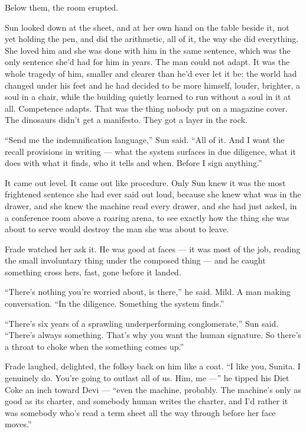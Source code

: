 \documentclass[11pt,openany]{book}
\begin{document}
Below them, the room erupted.

Sun looked down at the sheet, and at her own hand on the table beside it, not yet holding the pen, and did the arithmetic, all of it, the way she did everything. She loved him and she was done with him in the same sentence, which was the only sentence she'd had for him in years. The man could not adapt. It was the whole tragedy of him, smaller and clearer than he'd ever let it be: the world had changed under his feet and he had decided to be more himself, louder, brighter, a soul in a chair, while the building quietly learned to run without a soul in it at all. Competence adapts. That was the thing nobody put on a magazine cover. The dinosaurs didn't get a manifesto. They got a layer in the rock.

``Send me the indemnification language,'' Sun said. ``All of it. And I want the recall provisions in writing --- what the system surfaces in due diligence, what it does with what it finds, who it tells and when. Before I sign anything.''

It came out level. It came out like procedure. Only Sun knew it was the most frightened sentence she had ever said out loud, because she knew what was in the drawer, and she knew the machine read every drawer, and she had just asked, in a conference room above a roaring arena, to see exactly how the thing she was about to serve would destroy the man she was about to leave.

Frade watched her ask it. He was good at faces --- it was most of the job, reading the small involuntary thing under the composed thing --- and he caught something cross hers, fast, gone before it landed.

``There's nothing you're worried about, is there,'' he said. Mild. A man making conversation. ``In the diligence. Something the system finds.''

``There's six years of a sprawling underperforming conglomerate,'' Sun said. ``There's always something. That's why you want the human signature. So there's a throat to choke when the something comes up.''

Frade laughed, delighted, the folksy back on him like a coat. ``I like you, Sunita. I genuinely do. You're going to outlast all of us. Him, me ---'' he tipped his Diet Coke an inch toward Devi --- ``even the machine, probably. The machine's only as good as its charter, and somebody human writes the charter, and I'd rather it was somebody who's read a term sheet all the way through before her face moves.''
\end{document}
